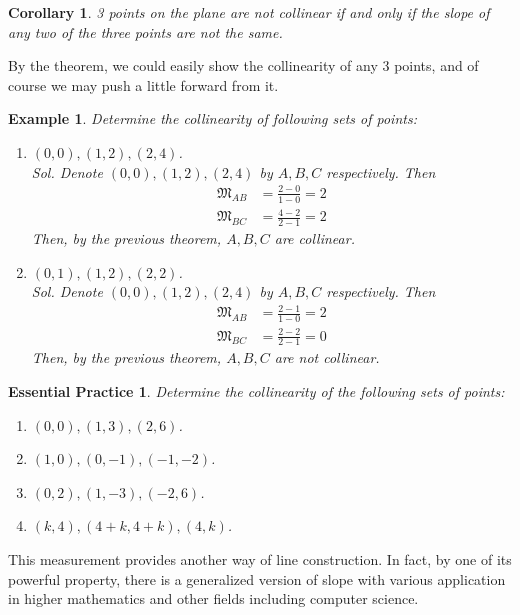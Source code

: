 \documentclass[12pt]{article}
\newtheorem*{corollary}{Corollary}
\newtheorem*{example}{Example}
\newtheorem{exercise}{Essential Practice}[subsection]
\begin{document}
    \begin{corollary}
        3 points on the plane are not collinear if and only if the slope of any two of the three points are not the same.
    \end{corollary}

    By the theorem, we could easily show the collinearity of any 3 points, and of course we may push a little forward from it.
    
    \begin{example}
        Determine the collinearity of following sets of points:\begin{enumerate}
            \item $(0,0), (1,2), (2,4)$.\\
            \textit{ Sol. } Denote $(0,0), (1,2), (2,4)$ by $A,B,C$ respectively. Then \begin{align*}
                \mathfrak{M}_{AB}&=\frac{2-0}{1-0}=2\\
                \mathfrak{M}_{BC}&=\frac{4-2}{2-1}=2
            \end{align*}
            Then, by the previous theorem, $A,B,C$ are collinear.
            \item $(0,1), (1,2), (2,2)$.\\
            \textit{ Sol. } Denote $(0,0), (1,2), (2,4)$ by $A,B,C$ respectively. Then \begin{align*}
                \mathfrak{M}_{AB}&=\frac{2-1}{1-0}=2\\
                \mathfrak{M}_{BC}&=\frac{2-2}{2-1}=0
            \end{align*}
            Then, by the previous theorem, $A,B,C$ are not collinear.
        \end{enumerate}
    \end{example}

    \begin{exercise}
        Determine the collinearity of the following sets of points:\begin{enumerate}
            \item $(0,0), (1,3), (2,6)$.
            \item $(1,0), (0,-1), (-1,-2)$.
            \item $(0,2), (1,-3), (-2,6)$.
            \item $(k,4), (4+k,4+k), (4,k)$.
        \end{enumerate}
    \end{exercise}

    This measurement provides another way of line construction. In fact, by one of its powerful property, there is a generalized version of slope with various application in higher mathematics and other fields including computer science.
\end{document}
